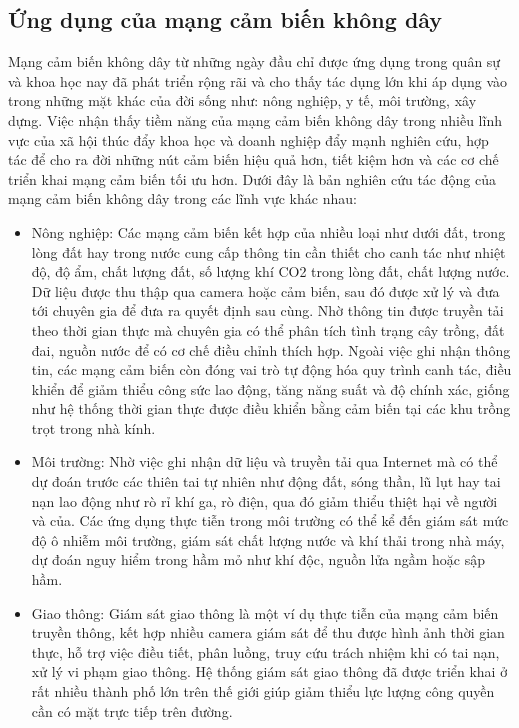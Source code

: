 \documentclass{hust}
\begin{document}
\subsection{Ứng dụng của mạng cảm biến không dây}
Mạng cảm biến không dây từ những ngày đầu chỉ được ứng dụng trong quân sự và khoa học nay đã phát triển rộng rãi và cho thấy tác dụng lớn khi áp dụng vào trong những mặt khác của đời sống như: nông nghiệp, y tế, môi trường, xây dựng. Việc nhận thấy tiềm năng của mạng cảm biến không dây trong nhiều lĩnh vực của xã hội thúc đẩy khoa học và doanh nghiệp đẩy mạnh nghiên cứu, hợp tác để cho ra đời những nút cảm biến hiệu quả hơn, tiết kiệm hơn và các cơ chế triển khai mạng cảm biến tối ưu hơn. Dưới đây là bản nghiên cứu tác động của mạng cảm biến không dây trong các lĩnh vực khác nhau:\cite{ramson2017applications}
\begin{itemize}
	\item Nông nghiệp: Các mạng cảm biến kết hợp của nhiều loại như dưới đất, trong lòng đất hay trong nước cung cấp thông tin cần thiết cho canh tác như nhiệt độ, độ ẩm, chất lượng đất, số lượng khí CO2 trong lòng đất, chất lượng nước. Dữ liệu được thu thập qua camera hoặc cảm biến, sau đó được xử lý và đưa tới chuyên gia để đưa ra quyết định sau cùng. Nhờ thông tin được truyền tải theo thời gian thực mà chuyên gia có thể phân tích tình trạng cây trồng, đất đai, nguồn nước để có cơ chế điều chỉnh thích hợp. Ngoài việc ghi nhận thông tin, các mạng cảm biến còn đóng vai trò tự động hóa quy trình canh tác, điều khiển để giảm thiểu công sức lao động, tăng năng suất và độ chính xác, giống như hệ thống thời gian thực được điều khiển bằng cảm biến tại các khu trồng trọt trong nhà kính.
	\item Môi trường: Nhờ việc ghi nhận dữ liệu và truyền tải qua Internet mà có thể dự đoán trước các thiên tai tự nhiên như động đất, sóng thần, lũ lụt hay tai nạn lao động như rò rỉ khí ga, rò điện, qua đó giảm thiểu thiệt hại về người và của. Các ứng dụng thực tiễn trong môi trường có thể kể đến giám sát mức độ ô nhiễm môi trường, giám sát chất lượng nước và khí thải trong nhà máy, dự đoán nguy hiểm trong hầm mỏ như khí độc, nguồn lửa ngầm hoặc sập hầm. 
	\item Giao thông: Giám sát giao thông là một ví dụ thực tiễn của mạng cảm biến truyền thông, kết hợp nhiều camera giám sát để thu được hình ảnh thời gian thực, hỗ trợ việc điều tiết, phân luồng, truy cứu trách nhiệm khi có tai nạn, xử lý vi phạm giao thông. Hệ thống giám sát giao thông đã được triển khai ở rất nhiều thành phố lớn trên thế giới giúp giảm thiểu lực lượng công quyền cần có mặt trực tiếp trên đường. 

\end{itemize}
\end{document}
